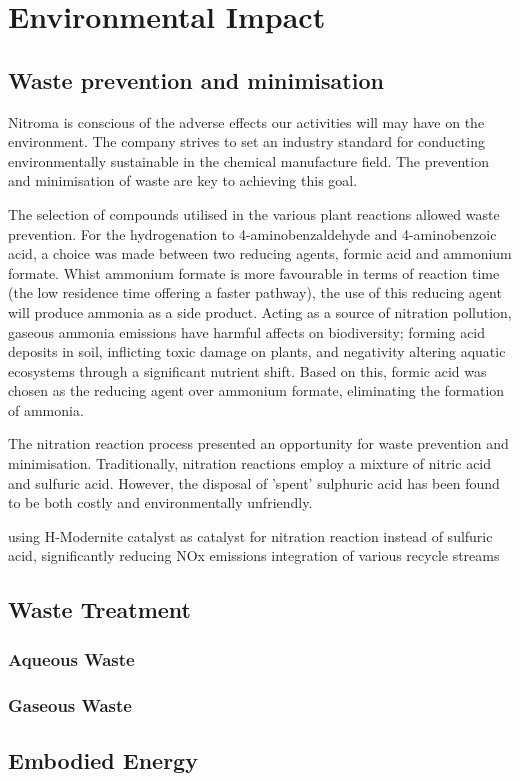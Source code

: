 \section{Environmental Impact}

\subsection{Waste prevention and minimisation }

Nitroma is conscious of the adverse effects our activities will may have on the environment. The company strives to set an industry standard for conducting environmentally sustainable in the chemical manufacture field. The prevention and minimisation of waste are key to achieving this goal. 

The selection of compounds utilised in the various plant reactions allowed waste prevention. For the hydrogenation to 4-aminobenzaldehyde and 4-aminobenzoic acid, a choice was made between two reducing agents, formic acid and ammonium formate. Whist ammonium formate is more favourable in terms of reaction time (the low residence time offering a faster pathway), the use of this reducing agent will produce ammonia as a side product. Acting as a  source of nitration pollution, gaseous ammonia emissions have harmful affects on biodiversity; forming acid deposits in soil, inflicting toxic damage on plants, and negativity altering aquatic ecosystems through a significant nutrient shift. Based on this, formic acid was chosen as the reducing agent over ammonium formate, eliminating the formation of ammonia. 

The nitration reaction process presented an opportunity for waste prevention and minimisation. Traditionally, nitration reactions employ a mixture of nitric acid and sulfuric acid. However, the disposal of 'spent' sulphuric acid has been found to be both costly and environmentally unfriendly. 





    
    using H-Modernite catalyst as catalyst for nitration reaction instead of sulfuric acid, significantly reducing NOx emissions
  integration of various recycle streams


\subsection{Waste Treatment}

\subsubsection{Aqueous Waste}


\subsubsection{Gaseous Waste}

\subsection{Embodied Energy}